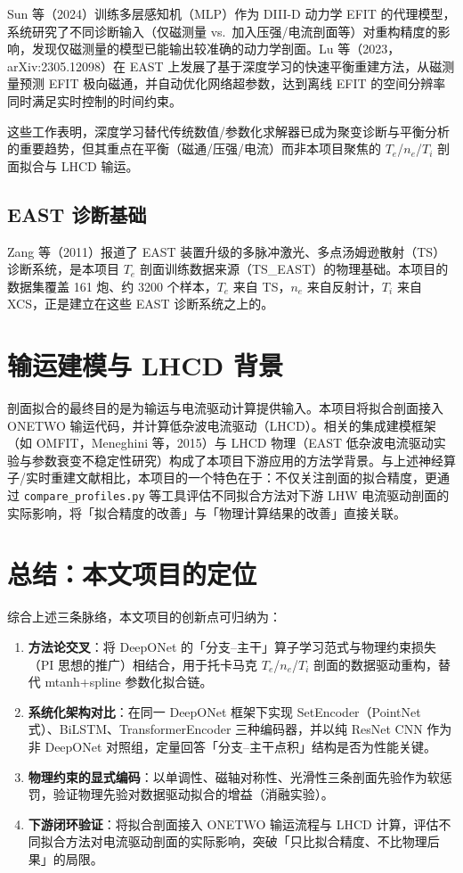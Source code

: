 \documentclass[12pt,a4paper]{article}
\begin{document}
Sun 等（2024）训练多层感知机（MLP）作为 DIII-D 动力学 EFIT 的代理模型，系统研究了不同诊断输入（仅磁测量 vs.\ 加入压强/电流剖面等）对重构精度的影响，发现仅磁测量的模型已能输出较准确的动力学剖面。Lu 等（2023，arXiv:2305.12098）在 EAST 上发展了基于深度学习的快速平衡重建方法，从磁测量预测 EFIT 极向磁通，并自动优化网络超参数，达到离线 EFIT 的空间分辨率同时满足实时控制的时间约束。

这些工作表明，深度学习替代传统数值/参数化求解器已成为聚变诊断与平衡分析的重要趋势，但其重点在平衡（磁通/压强/电流）而非本项目聚焦的 $T_e$/$n_e$/$T_i$ 剖面拟合与 LHCD 输运。

\subsection{EAST 诊断基础}

Zang 等（2011）报道了 EAST 装置升级的多脉冲激光、多点汤姆逊散射（TS）诊断系统，是本项目 $T_e$ 剖面训练数据来源（TS\_EAST）的物理基础。本项目的数据集覆盖 161 炮、约 3200 个样本，$T_e$ 来自 TS，$n_e$ 来自反射计，$T_i$ 来自 XCS，正是建立在这些 EAST 诊断系统之上的。

\section{输运建模与 LHCD 背景}

剖面拟合的最终目的是为输运与电流驱动计算提供输入。本项目将拟合剖面接入 ONETWO 输运代码，并计算低杂波电流驱动（LHCD）。相关的集成建模框架（如 OMFIT，Meneghini 等，2015）与 LHCD 物理（EAST 低杂波电流驱动实验与参数衰变不稳定性研究）构成了本项目下游应用的方法学背景。与上述神经算子/实时重建文献相比，本项目的一个特色在于：不仅关注剖面的拟合精度，更通过 \texttt{compare\_profiles.py} 等工具评估不同拟合方法对下游 LHW 电流驱动剖面的实际影响，将「拟合精度的改善」与「物理计算结果的改善」直接关联。

\section{总结：本文项目的定位}

综合上述三条脉络，本文项目的创新点可归纳为：

\begin{enumerate}[label=\arabic*.]
    \item \textbf{方法论交叉}：将 DeepONet 的「分支--主干」算子学习范式与物理约束损失（PI 思想的推广）相结合，用于托卡马克 $T_e$/$n_e$/$T_i$ 剖面的数据驱动重构，替代 mtanh+spline 参数化拟合链。
    \item \textbf{系统化架构对比}：在同一 DeepONet 框架下实现 SetEncoder（PointNet 式）、BiLSTM、TransformerEncoder 三种编码器，并以纯 ResNet CNN 作为非 DeepONet 对照组，定量回答「分支--主干点积」结构是否为性能关键。
    \item \textbf{物理约束的显式编码}：以单调性、磁轴对称性、光滑性三条剖面先验作为软惩罚，验证物理先验对数据驱动拟合的增益（消融实验）。
    \item \textbf{下游闭环验证}：将拟合剖面接入 ONETWO 输运流程与 LHCD 计算，评估不同拟合方法对电流驱动剖面的实际影响，突破「只比拟合精度、不比物理后果」的局限。
\end{enumerate}
\end{document}
